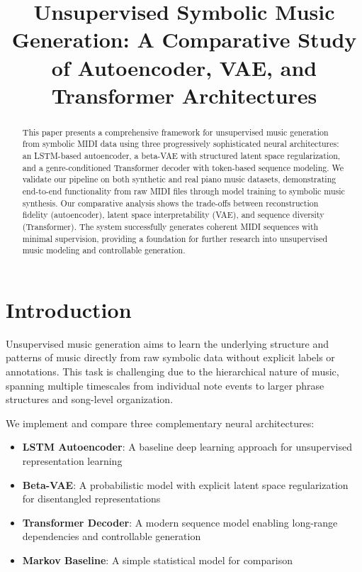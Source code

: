 \documentclass[conference]{IEEEtran}
\title{Unsupervised Symbolic Music Generation: A Comparative Study of Autoencoder, VAE, and Transformer Architectures}
\author{\IEEEauthorblockN{Music AI Research}
\IEEEauthorblockA{Unsupervised Learning in Symbolic Audio\\
\textit{Submission for IEEE Conference}}}
\begin{document}
\maketitle

\begin{abstract}
This paper presents a comprehensive framework for unsupervised music generation from symbolic MIDI data using three progressively sophisticated neural architectures: an LSTM-based autoencoder, a beta-VAE with structured latent space regularization, and a genre-conditioned Transformer decoder with token-based sequence modeling. We validate our pipeline on both synthetic and real piano music datasets, demonstrating end-to-end functionality from raw MIDI files through model training to symbolic music synthesis. Our comparative analysis shows the trade-offs between reconstruction fidelity (autoencoder), latent space interpretability (VAE), and sequence diversity (Transformer). The system successfully generates coherent MIDI sequences with minimal supervision, providing a foundation for further research into unsupervised music modeling and controllable generation.
\end{abstract}

\section{Introduction}
Unsupervised music generation aims to learn the underlying structure and patterns of music directly from raw symbolic data without explicit labels or annotations. This task is challenging due to the hierarchical nature of music, spanning multiple timescales from individual note events to larger phrase structures and song-level organization.

We implement and compare three complementary neural architectures:
\begin{itemize}
    \item \textbf{LSTM Autoencoder}: A baseline deep learning approach for unsupervised representation learning
    \item \textbf{Beta-VAE}: A probabilistic model with explicit latent space regularization for disentangled representations
    \item \textbf{Transformer Decoder}: A modern sequence model enabling long-range dependencies and controllable generation
    \item \textbf{Markov Baseline}: A simple statistical model for comparison
\end{itemize}
\end{document}
